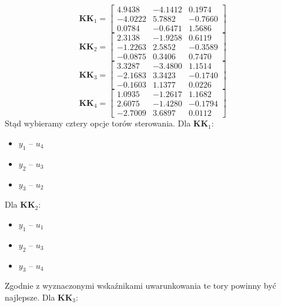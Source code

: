 \begin{equation}
  \bm{KK}_1 =
  \begin{bmatrix}
   \num{ 4,9438} &  \num{-4,1412}  & \num{ 0,1974} \\
   \num{-4,0222}  & \num{ 5,7882}  & \num{-0,7660} \\
   \num{ 0,0784} &  \num{-0,6471} &  \num{ 1,5686}
  \end{bmatrix}
\end{equation}
\begin{equation}
  \bm{KK}_2 =
  \begin{bmatrix}
   \num{ 2,3138} &  \num{-1,9258}  & \num{ 0,6119} \\
   \num{-1,2263}   & \num{ 2,5852}  & \num{-0,3589} \\
   \num{-0,0875}   &\num{ 0,3406} &  \num{ 0,7470}
  \end{bmatrix}
\end{equation}
\begin{equation}
  \bm{KK}_3 =
  \begin{bmatrix}
   \num{ 3,3287} &  \num{-3,4800}  & \num{ 1,1514} \\
   \num{-2,1683}  & \num{ 3,3423} &  \num{-0,1740} \\
   \num{-0,1603}  & \num{ 1,1377}  & \num{ 0,0226}
  \end{bmatrix}
\end{equation}
\begin{equation}
  \bm{KK}_4 =
  \begin{bmatrix}
   \num{ 1,0935}  & \num{-1,2617}  & \num{ 1,1682} \\
   \num{ 2,6075} &  \num{-1,4280}  & \num{-0,1794} \\
   \num{-2,7009}  & \num{ 3,6897} &  \num{ 0,0112}
  \end{bmatrix}
\end{equation}
Stąd wybieramy cztery opcje torów sterowania. Dla $\bm{KK}_1$:
\begin{itemize}
  \item $y_1$ -- $u_4$
 \item $y_2$ -- $u_3$
 \item $y_3$ -- $u_2$
\end{itemize}
 Dla $\bm{KK}_2$:
\begin{itemize}
  \item $y_1$ -- $u_1$
 \item $y_2$ -- $u_3$
 \item $y_3$ -- $u_4$
\end{itemize}
Zgodnie z wyznaczonymi wskaźnikami uwarunkowania te tory powinny być najlepsze. Dla $\bm{KK}_3$:

